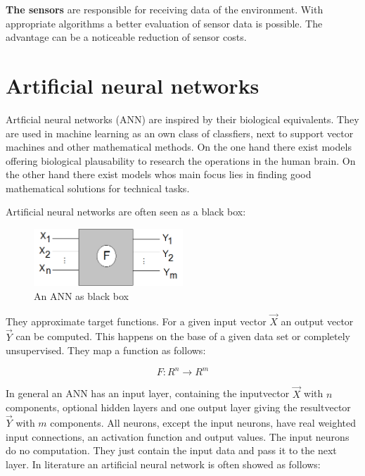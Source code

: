 \documentclass[10pt,a4paper,DIV=11]{scrreprt}
\begin{document}
\textbf{The sensors} are responsible for receiving data of the environment. With appropriate algorithms a better evaluation of sensor data is possible. The advantage can be a noticeable reduction of sensor costs.


\chapter{Artificial neural networks}
Artficial neural networks (ANN) are inspired by their biological equivalents.
They are used in machine learning as an own class of classfiers, next to support vector machines
and other mathematical methods. On the one hand there exist models offering biological plausability to research the
operations in the human brain. On the other hand there exist models whos main focus lies in finding good mathematical solutions for technical tasks.

Artificial neural networks are often seen as a black box: \\

\begin{center}
	\begin{figure}[H]
		\centering
		\includegraphics[width=0.5\textwidth,scale=1.0]{files/nn-bb.png}  
		\caption{An ANN as black box \cite{rojas}}
		\label{fig:neuron}
	\end{figure}
\end{center} 
They approximate target functions. For a given input vector $\vec{X}$ an output vector $\vec{Y}$ can be computed.
This happens on the base of a given data set or completely unsupervised.
They map a function as follows\cite{rojas}:

\begin{equation}
	F: R^n \to R^m 
\end{equation} 

In general an ANN has an input layer, containing the inputvector $\vec{X}$ with $n$ components, optional hidden layers and one output layer giving the resultvector $\vec{Y}$ with $m$ components.
All neurons, except the input neurons, have real weighted input connections, an activation function and output values. The input neurons do no computation. They just contain the input data and pass it to the next layer. In literature an artificial neural network is often showed as follows: \cite{rojas} \cite{rey}
\end{document}
